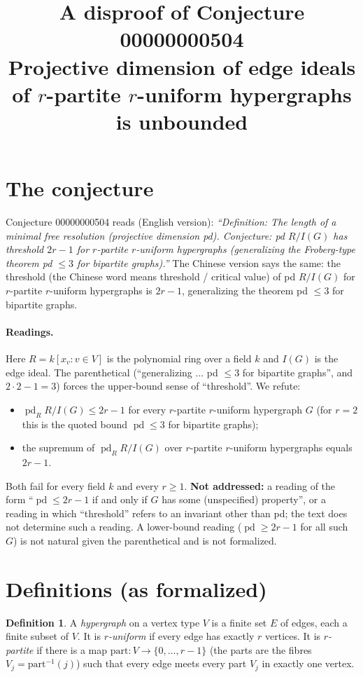 \documentclass[11pt]{article}
\title{A disproof of Conjecture 00000000504\\[2pt]
\large Projective dimension of edge ideals of $r$-partite $r$-uniform hypergraphs is unbounded}
\date{}
\theoremstyle{definition}
\newtheorem{definition}[theorem]{Definition}
\theoremstyle{remark}
\renewcommand{\_}{\oldus\allowbreak}
\newcommand{\pd}{\operatorname{pd}}
\begin{document}
\sloppy
\maketitle

\section{The conjecture}

Conjecture 00000000504 reads (English version): \emph{``Definition: The length of a minimal free
resolution (projective dimension pd). Conjecture: pd $R/I(G)$ has threshold $2r-1$ for $r$-partite
$r$-uniform hypergraphs (generalizing the Froberg-type theorem pd $\le 3$ for bipartite graphs).''}
The Chinese version says the same: the threshold (the Chinese word means threshold / critical value)
of pd $R/I(G)$ for $r$-partite $r$-uniform hypergraphs is $2r-1$, generalizing the theorem pd
$\le 3$ for bipartite graphs.

\paragraph{Readings.} Here $R=k[x_v : v\in V]$ is the polynomial ring over a field $k$ and $I(G)$
is the edge ideal. The parenthetical (``generalizing ... pd $\le 3$ for bipartite graphs'', and
$2\cdot 2-1=3$) forces the upper-bound sense of ``threshold''. We refute:
\begin{itemize}[nosep]
\item[(A)] $\pd_R R/I(G)\le 2r-1$ for every $r$-partite $r$-uniform hypergraph $G$ (for $r=2$ this
  is the quoted bound $\pd\le 3$ for bipartite graphs);
\item[(B)] the supremum of $\pd_R R/I(G)$ over $r$-partite $r$-uniform hypergraphs equals $2r-1$.
\end{itemize}
Both fail for every field $k$ and every $r\ge 1$. \textbf{Not addressed:} a reading of the form
``$\pd\le 2r-1$ if and only if $G$ has some (unspecified) property'', or a reading in which
``threshold'' refers to an invariant other than pd; the text does not determine such a reading.
A lower-bound reading ($\pd\ge 2r-1$ for all such $G$) is not natural given the parenthetical and is
not formalized.

\section{Definitions (as formalized)}

\begin{definition}
A \emph{hypergraph} on a vertex type $V$ is a finite set $E$ of edges, each a finite subset of
$V$. It is \emph{$r$-uniform} if every edge has exactly $r$ vertices. It is \emph{$r$-partite} if
there is a map $\mathrm{part}:V\to\{0,\dots,r-1\}$ (the parts are the fibres
$V_j=\mathrm{part}^{-1}(j)$) such that every edge meets every part $V_j$ in exactly one vertex.
\end{definition}
\end{document}
